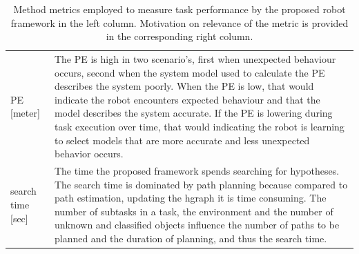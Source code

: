\noindent
\begin{table}[H]
\caption{Method metrics employed to measure task performance by the proposed robot framework in the left column. Motivation on relevance of the metric is provided in the corresponding right column.}\label{table:proposed_method_metrics}
\centering
\begin{tabular}%
  {>{\raggedright\arraybackslash}p{}%
   >{\raggedright\arraybackslash}p{}}
\acl{PE} [meter] &  The \ac{PE} is high in two scenario's, first when unexpected behaviour occurs, second when the system model used to calculate the \ac{PE} describes the system poorly. When the \ac{PE} is low, that would indicate the robot encounters expected behaviour and that the model describes the system accurate. If the \ac{PE} is lowering during task execution over time, that would indicating the robot is learning to select models that are more accurate and less unexpected behavior occurs.\\
search time [sec]& The time the proposed framework spends searching for hypotheses. The search time is dominated by path planning because compared to path estimation, updating the \ac{hgraph} it is time consuming. The number of subtasks in a task, the environment and the number of unknown and classified objects influence the number of paths to be planned and the duration of planning, and thus the search time.\\ 

\end{tabular}
\end{table}
